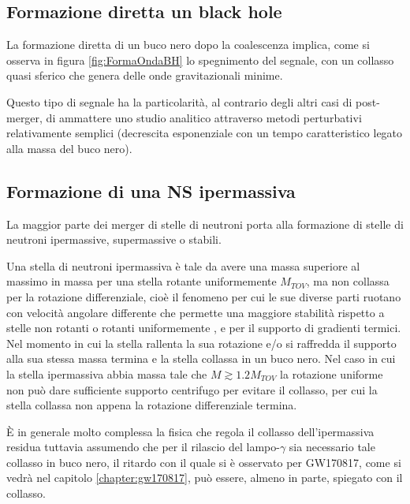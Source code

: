 \subsection{Formazione diretta un black hole}	
\label{subsection:Diretto_Black_hole}

La formazione diretta di un buco nero dopo la coalescenza implica, come si osserva in figura \ref{fig:FormaOndaBH} lo spegnimento del segnale, con un collasso quasi sferico che genera delle onde gravitazionali minime\cite{sarin2020evolution}.

Questo tipo di segnale ha la particolarità, al contrario degli altri casi di post-merger, di ammattere uno studio analitico attraverso metodi perturbativi relativamente semplici (decrescita esponenziale con un tempo caratteristico legato alla massa del buco nero)\cite{maggiore2018gravitational}.

\subsection{Formazione di una NS ipermassiva}
\label{subsection:ipermassiva}	
La maggior parte dei merger di stelle di neutroni porta alla formazione di stelle di neutroni ipermassive, supermassive o stabili. 

Una stella di neutroni ipermassiva è tale da avere una massa superiore al massimo in massa per una stella rotante uniformemente $M_{TOV}$, ma non collassa per la rotazione differenziale, cioè il fenomeno per cui le sue diverse parti ruotano con velocità angolare differente che permette una maggiore stabilità rispetto a stelle non rotanti o rotanti uniformemente \cite{Baumgarte_2000}, e per il supporto di gradienti termici. Nel momento in cui la stella rallenta la sua rotazione e/o si raffredda il supporto alla sua stessa massa termina e la stella collassa in un buco nero. 
Nel caso in cui la stella ipermassiva abbia massa tale che $M \gtrsim 1.2 M_{TOV}$ la rotazione uniforme non può dare sufficiente supporto centrifugo per evitare il collasso, per cui la stella collassa non appena la rotazione differenziale termina.

È in generale molto complessa la fisica che regola il collasso dell'ipermassiva residua tuttavia assumendo che per il rilascio del lampo-$\gamma$ sia necessario tale collasso in buco nero, il ritardo con il quale si è osservato per GW170817, come si vedrà nel capitolo \ref{chapter:gw170817}, può essere, almeno in parte, spiegato con il collasso.

